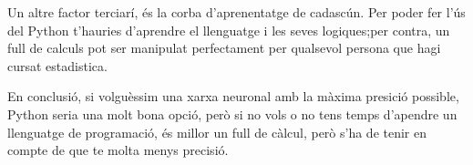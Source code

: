 Un altre factor terciarí, és la corba d'aprenentatge de cadascún. Per poder fer l'ús del Python t'hauries d'aprendre el llenguatge i les seves logiques;per contra, un full de calculs pot ser manipulat perfectament per qualsevol persona que hagi cursat estadistica.


En conclusió, si volguèssim una xarxa neuronal amb la màxima presició possible, Python seria una molt bona opció, però si no vols o no tens temps d'apendre un llenguatge de programació, és millor un full de càlcul, però s'ha de tenir en compte de que te molta menys precisió.






















